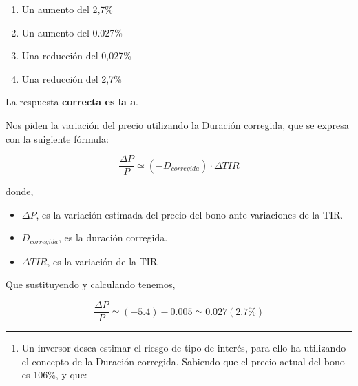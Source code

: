 \documentclass[
  letterpaper,
  DIV=11,
  numbers=noendperiod]{scrreprt}
\providecommand{\tightlist}{%
  \setlength{\itemsep}{0pt}\setlength{\parskip}{0pt}}\usepackage{longtable,booktabs,array}
\begin{document}
\begin{enumerate}
\def\labelenumi{\alph{enumi})}
\item
  Un aumento del 2,7\%
\item
  Un aumento del 0.027\%
\item
  Una reducción del 0,027\%
\item
  Una reducción del 2,7\%
\end{enumerate}

\begin{tcolorbox}[enhanced jigsaw, left=2mm, opacityback=0, colback=white, breakable, arc=.35mm, bottomrule=.15mm, rightrule=.15mm, toprule=.15mm, leftrule=.75mm, colframe=quarto-callout-tip-color-frame]
\begin{minipage}[t]{5.5mm}
\textcolor{quarto-callout-tip-color}{\faLightbulb}
\end{minipage}%
\begin{minipage}[t]{\textwidth - 5.5mm}

La respuesta \textbf{correcta es la a}.

Nos piden la variación del precio utilizando la Duración corregida, que
se expresa con la suigiente fórmula:

\[\frac{\Delta P}{P}\simeq \left(-D_{corregida}\right)\cdot\Delta TIR\]

donde,

\begin{itemize}
\item
  \(\Delta P\), es la variación estimada del precio del bono ante
  variaciones de la TIR.
\item
  \(D_{corregida}\), es la duración corregida.
\item
  \(\Delta TIR\), es la variación de la TIR
\end{itemize}

Que sustituyendo y calculando tenemos,

\[\frac{\Delta P}{P}\simeq \left(-5.4\right)-0.005\simeq0.027(2.7\%)\]

\end{minipage}%
\end{tcolorbox}

\begin{center}\rule{0.5\linewidth}{0.5pt}\end{center}

\begin{enumerate}
\def\labelenumi{\arabic{enumi}.}
\setcounter{enumi}{107}
\tightlist
\item
  Un inversor desea estimar el riesgo de tipo de interés, para ello ha
  utilizando el concepto de la Duración corregida. Sabiendo que el
  precio actual del bono es 106\%, y que:
\end{enumerate}
\end{document}
